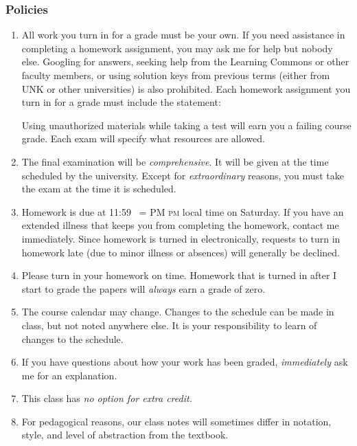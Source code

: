\documentclass[12pt,fullpage]{article}
\makeatletter
\newcounter{ex}\setcounter{ex}{0}
\DeclareRobustCommand{\maybefakesc}[1]{%
  \ifnum\pdfstrcmp{\f@series}{\bfdefault}=\z@
    {\fontsize{\dimexpr0.8\dimexpr\f@size pt\relax}{0}\selectfont\uppercase{#1}}%
  \else
    \textsc{#1}%
  \fi
}
\newcommand\PM{\,\maybefakesc{pm}\xspace}
\makeatother
\begin{document}
\subsubsection* {Policies}


\begin{enumerate}

\item All work you turn in for a grade must be your own.  If you need assistance in completing a homework assignment, you may ask me for help but nobody else. Googling for
answers, seeking help from the Learning Commons or other faculty members,  or using solution keys from previous terms (either from UNK or other universities) is also prohibited.  Each homework assignment you turn in for a grade must include the statement:

\begin{quote}
\end{quote}
Using unauthorized materials while taking a test will earn you a failing course grade. Each exam will specify what resources are allowed. 

 \item The final examination will be \emph{comprehensive}. It will be given at the time scheduled by the university.
 Except for \emph{extraordinary} reasons, you must take the exam at the
 time it is scheduled. 

 \item Homework is due at 11:59 \PM local time on Saturday. If you have an 
 extended illness that keeps you from completing the homework, contact
  me immediately. Since homework is turned in electronically, requests to 
turn in homework late (due to minor illness or absences) will generally be declined.

\item Please turn in your homework on time. Homework that is turned in after I start to grade the
papers will \emph{always} earn a grade of zero. 

\item The course calendar may change. Changes to the schedule can be made in class, but 
not noted anywhere else. It is your responsibility to
learn of changes to the schedule.



\item If you have questions about how your work has been graded,  \emph{immediately}  ask me for an explanation.

\item This class has \emph{no option for extra credit.}


\item  For pedagogical reasons, our class notes will sometimes differ in notation, 
style, and level of abstraction from the textbook.


\end{enumerate}
\end{document}

